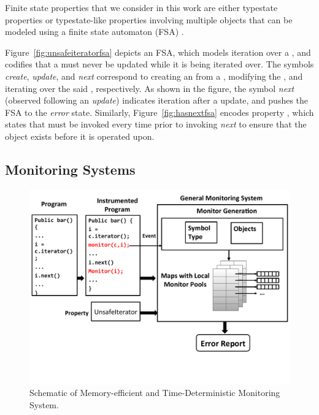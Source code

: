 Finite state properties that we consider in this work are either typestate
properties or typestate-like properties involving multiple objects that can be
modeled using a finite state automaton (FSA) \cite{Strom:TSE86}.

Figure~\ref{fig:unsafeiteratorfsa} depicts an FSA, 
which models iteration over a , and codifies that a 
 must never be updated while it is being iterated over. The 
symbols \textit{create}, \textit{update}, and \textit{next} correspond to 
creating an  from a , modifying the 
, and iterating over the said , respectively. 
As shown in the figure, the symbol \textit{next} (observed following an 
\textit{update}) indicates iteration after a  update, and 
pushes the FSA to the \textit{error} state. Similarly, 
Figure~\ref{fig:hasnextfsa} encodes  property , 
which states that  must be invoked every time prior to invoking 
\textit{next} to ensure that the object exists before it is operated upon.

\subsection{Monitoring Systems}
\label{sec:motivation:monitor}

\begin{figure}[t]
\centering
  \includegraphics[width=\linewidth, trim = 0 2cm 0 0]{./images/general_monitoring_scheme.pdf}
  \caption[Schematic of Memory-efficient and Time-Deterministic Monitoring 
System]{Schematic of Memory-efficient and Time-Deterministic Monitoring System.}
  \label{fig:general_schematic}
\end{figure}

